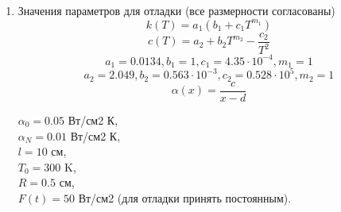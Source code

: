 \begin{enumerate}
	\item Значения параметров для отладки (все размерности согласованы)
	\begin{equation*}\label{formula5}
		k(T) = a_1(b_1 + c_1T^{m_1})
	\end{equation*}
	\begin{equation*}\label{formula6}
		c(T) = a_2 + b_2T^{m_2} - \frac{c_2}{T^2}
	\end{equation*}
	\begin{equation*}\label{formula7}
		a_1 = 0.0134, b_1 = 1, c_1 = 4.35\cdot10^{-4}, m_1 = 1
	\end{equation*}
	\begin{equation*}\label{formula8}
		a_2 = 2.049, b_2 = 0.563\cdot10^{-3}, c_2 = 0.528\cdot10^5, m_2 = 1
	\end{equation*}
	\begin{equation*}\label{formula9}
		\alpha(x) = \frac{c}{x-d}
	\end{equation*}
		
	$\alpha_0 = 0.05$ Вт/см2 К,	\\
	$\alpha_N = 0.01$ Вт/см2 К, \\
	$l = 10$ см, \\
	$T_0 = 300$ K, \\
	$R = 0.5$ см, \\
	$F(t) = 50$ Вт/см2 (для отладки принять постоянным).
	
\end{enumerate}







